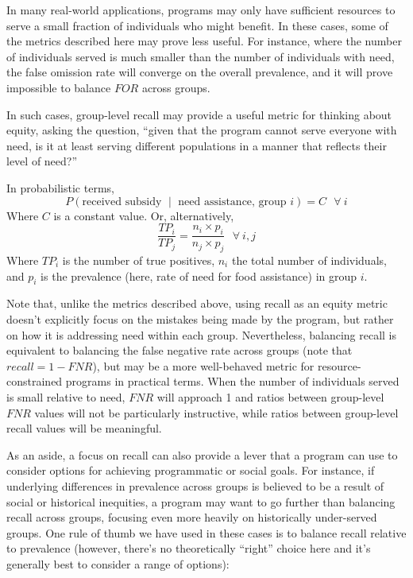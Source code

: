 \documentclass[]{krantz}
\begin{document}
In many real-world applications, programs may only have sufficient
resources to serve a small fraction of individuals who might benefit. In
these cases, some of the metrics described here may prove less useful.
For instance, where the number of individuals served is much smaller
than the number of individuals with need, the false omission rate will
converge on the overall prevalence, and it will prove impossible to
balance \(FOR\) across groups.

In such cases, group-level recall may provide a useful metric for
thinking about equity, asking the question, ``given that the program
cannot serve everyone with need, is it at least serving different
populations in a manner that reflects their level of need?''

In probabilistic terms,
\[P(\textrm{received subsidy $\mid$ need assistance, group $i$}) = C~~~\forall~i\]
Where \(C\) is a constant value. Or, alternatively,
\[\frac{TP_i}{TP_j} = \frac{n_i \times p_i}{n_j \times p_j}~~~\forall~i,j\]
Where \(TP_i\) is the number of true positives, \(n_i\) the total number
of individuals, and \(p_i\) is the prevalence (here, rate of need for
food assistance) in group \(i\).

Note that, unlike the metrics described above, using recall as an equity
metric doesn't explicitly focus on the mistakes being made by the
program, but rather on how it is addressing need within each group.
Nevertheless, balancing recall is equivalent to balancing the false
negative rate across groups (note that \(recall = 1-FNR\)), but may be a
more well-behaved metric for resource-constrained programs in practical
terms. When the number of individuals served is small relative to need,
\(FNR\) will approach 1 and ratios between group-level \(FNR\) values
will not be particularly instructive, while ratios between group-level
recall values will be meaningful.

As an aside, a focus on recall can also provide a lever that a program
can use to consider options for achieving programmatic or social goals.
For instance, if underlying differences in prevalence across groups is
believed to be a result of social or historical inequities, a program
may want to go further than balancing recall across groups, focusing
even more heavily on historically under-served groups. One rule of thumb
we have used in these cases is to balance recall relative to prevalence
(however, there's no theoretically ``right'' choice here and it's
generally best to consider a range of options):
\end{document}
